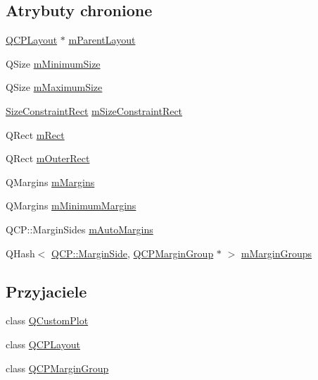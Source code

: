 \subsection*{Atrybuty chronione}
\begin{DoxyCompactItemize}
\item 
\hyperlink{class_q_c_p_layout}{Q\+C\+P\+Layout} $\ast$ \hyperlink{class_q_c_p_layout_element_ae7c75c25549608bd688bdb65d4c38066}{m\+Parent\+Layout}
\item 
Q\+Size \hyperlink{class_q_c_p_layout_element_affef747c81632de33f08483b7fd10d01}{m\+Minimum\+Size}
\item 
Q\+Size \hyperlink{class_q_c_p_layout_element_a64a387973fd4addac842028c89088998}{m\+Maximum\+Size}
\item 
\hyperlink{class_q_c_p_layout_element_a0afb3e5773529e4bd20e448f81be4d2a}{Size\+Constraint\+Rect} \hyperlink{class_q_c_p_layout_element_acc012635b1ae178ff3c4da8a3af303a2}{m\+Size\+Constraint\+Rect}
\item 
Q\+Rect \hyperlink{class_q_c_p_layout_element_ad8896f05550389f7b9e92c9e6cdf6e01}{m\+Rect}
\item 
Q\+Rect \hyperlink{class_q_c_p_layout_element_a07bb4973379e75cb0fa5b032c1d24afd}{m\+Outer\+Rect}
\item 
Q\+Margins \hyperlink{class_q_c_p_layout_element_ac2a32b99ee527ca5dfff9da03628fe94}{m\+Margins}
\item 
Q\+Margins \hyperlink{class_q_c_p_layout_element_a5ba71f25d1af4bb092b28df618538e63}{m\+Minimum\+Margins}
\item 
Q\+C\+P\+::\+Margin\+Sides \hyperlink{class_q_c_p_layout_element_af61c70354d1275778d68206b2a1b2d36}{m\+Auto\+Margins}
\item 
Q\+Hash$<$ \hyperlink{namespace_q_c_p_a7e487e3e2ccb62ab7771065bab7cae54}{Q\+C\+P\+::\+Margin\+Side}, \hyperlink{class_q_c_p_margin_group}{Q\+C\+P\+Margin\+Group} $\ast$ $>$ \hyperlink{class_q_c_p_layout_element_aeafbbc1130e02eee663c5326761fc963}{m\+Margin\+Groups}
\end{DoxyCompactItemize}
\subsection*{Przyjaciele}
\begin{DoxyCompactItemize}
\item 
class \hyperlink{class_q_c_p_layout_element_a1cdf9df76adcfae45261690aa0ca2198}{Q\+Custom\+Plot}
\item 
class \hyperlink{class_q_c_p_layout_element_a588aac0a0d721f6c5f10126d8596a20f}{Q\+C\+P\+Layout}
\item 
class \hyperlink{class_q_c_p_layout_element_ad077a686e85ab6fa03dcb2fd37fc499a}{Q\+C\+P\+Margin\+Group}
\end{DoxyCompactItemize}
